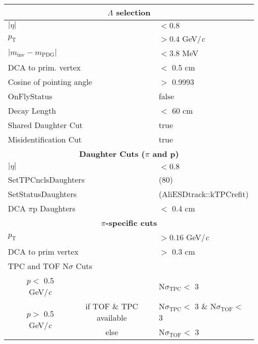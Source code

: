 \documentclass[ALICE,manyauthors]{cernphprep}
\newcommand{\Lam}{$\Lambda$\xspace}
\begin{document}
\begin{table}[htbp]
 \centering 
  \begin{tabular}{lc|c|l}
   \hline  
   \multicolumn{4}{c}{\textbf{\Lam selection}} \\
   \hline
   \multicolumn{3}{l|}{$|\eta|$} & $< 0.8$ \\
   \hline
   \multicolumn{3}{l|}{$p_{\mathrm{T}}$} & $> 0.4$ GeV/\textit{c} \\
   \hline
   \multicolumn{3}{l|}{$|m_{\mathrm{inv}} - m_{\mathrm{PDG}}|$} & $< 3.8$ MeV \\ 
   \hline
   \multicolumn{3}{l|}{DCA to prim. vertex} & $<$ 0.5 cm \\
   \hline
   \multicolumn{3}{l|}{Cosine of pointing angle} & $>$ 0.9993 \\
   \hline
   \multicolumn{3}{l|}{OnFlyStatus} & false \\
   \hline
   \multicolumn{3}{l|}{Decay Length} & $<$ 60 cm \\
   \hline
   \multicolumn{3}{l|}{Shared Daughter Cut} & true \\
   \hline
   \multicolumn{3}{l|}{Misidentification Cut} & true \\
   \hline   
   
   
   \multicolumn{4}{c}{\textbf{Daughter Cuts ($\pi$ and p)}} \\
   \hline
   \multicolumn{3}{l|}{$|\eta|$} &  $< 0.8$ \\
   \hline
   \multicolumn{3}{l|}{SetTPCnclsDaughters} & (80) \\
   \hline
   \multicolumn{3}{l|}{SetStatusDaughters} & (AliESDtrack::kTPCrefit) \\
   \hline
   \multicolumn{3}{l|}{DCA $\pi$p Daughters} & $<$ 0.4 cm \\
   \hline
   
   
   \multicolumn{4}{c}{\textbf{$\pi$-specific cuts}} \\
   \hline
   \multicolumn{3}{l|}{$p_{\mathrm{T}}$} & $> 0.16$ GeV/\textit{c} \\
   \hline
   \multicolumn{3}{l|}{DCA to prim vertex} & $>$ 0.3 cm \\
   \hline
   \multicolumn{4}{l}{TPC and TOF N$\sigma$ Cuts} \\
   \hline
    & \multicolumn{1}{c}{$p <$ 0.5 GeV/\textit{c}} &  & N$\sigma_{\mathrm{TPC}} <$ 3 \\
   \hline
    & \multirow{2}{*}{$p >$ 0.5 GeV/\textit{c}} &  if TOF \& TPC available & N$\sigma_{\mathrm{TPC}} <$ 3 \& N$\sigma_{\mathrm{TOF}} <$ 3 \\
   \cline{3-4}
    & & else & N$\sigma_{\mathrm{TOF}} <$ 3 \\
   \hline
   

\end{tabular}
\end{table}
\end{document}
